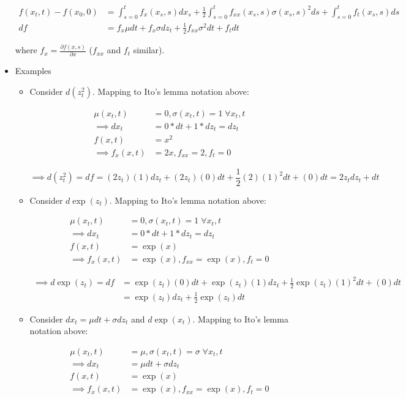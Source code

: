 \documentclass{article}
\begin{document}
\begin{itemize}
\begin{align*}
f(x_t, t) - f(x_0, 0) &= \int_{s=0}^t f_x(x_s, s) dx_s + \frac{1}{2} \int_{s=0}^t f_{xx} (x_s, s) \sigma(x_s, s)^2 ds + \int_{s=0}^t f_t(x_s, s) ds\\
df &= f_x \mu dt  + f_x \sigma dz_t + \frac{1}{2} f_{xx} \sigma^2 dt + f_t dt
\end{align*}

where $f_x = \frac{\partial f(x, s)}{\partial x}$ ($f_{xx}$ and $f_t$ similar).

\item Examples

\begin{itemize}

\item Consider $d(z_t^2)$.  Mapping to Ito's lemma notation above: 

\begin{align*}
\mu(x_t, t) &= 0, \sigma(x_t, t) = 1 \; \forall x_t, t \\
\implies dx_t &= 0*dt + 1*dz_t = dz_t\\
f(x, t) &= x^2 \\
\implies f_x(x, t) &= 2x, f_{xx} = 2, f_t = 0
\end{align*}

$$
\implies d(z_t^2) = df = (2z_t) (1) dz_t + (2z_t) (0) dt + \frac{1}{2} (2) (1)^2 dt + (0)dt = 2z_tdz_t + dt
$$

\item Consider $d \exp (z_t)$. Mapping to Ito's lemma notation above:

\begin{align*}
\mu(x_t, t) &= 0, \sigma(x_t, t) = 1 \; \forall x_t, t \\
\implies dx_t &= 0*dt + 1*dz_t = dz_t\\
f(x, t) &= \exp(x) \\
\implies f_x(x, t) &= \exp(x), f_{xx} = \exp(x), f_t = 0
\end{align*}

\begin{align*}
\implies d \exp (z_t) = df 
&= \exp(z_t) (0) dt + \exp(z_t) (1) dz_t + \frac{1}{2} \exp(z_t) (1)^2 dt + (0) dt\\
& = \exp(z_t) dz_t + \frac{1}{2} \exp(z_t) dt
\end{align*}

\item Consider $dx_t = \mu dt + \sigma dz_t$ and $d \exp(x_t)$. Mapping to Ito's lemma notation above:

\begin{align*}
\mu(x_t, t) &= \mu, \sigma(x_t, t) = \sigma \; \forall x_t, t \\
\implies dx_t &= \mu dt + \sigma dz_t\\
f(x, t) &= \exp(x) \\
\implies f_x(x, t) &= \exp(x), f_{xx} = \exp(x), f_t = 0
\end{align*}


\end{itemize}
\end{itemize}
\end{document}
